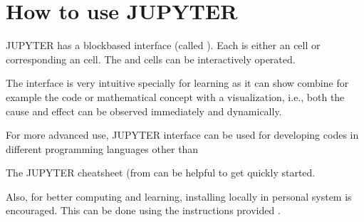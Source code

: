 \documentclass[letterpaper,10pt,english]{sphinxmanual}
\let\sphinxpxdimen\pdfpxdimen\else\newdimen\sphinxpxdimen
\begin{document}
\section{How to use JUPYTER}
\label{\detokenize{contents/background/02_jupyter:how-to-use-jupyter}}
JUPYTER has a block\sphinxhyphen{}based interface (called ). Each  is either an  cell or corresponding an   cell. The  and  cells can be interactively operated.

\noindent\sphinxincludegraphics[width=600\sphinxpxdimen]{{bg2_f1}.png}

The  interface is very intuitive specially for learning as it can show combine for example the code or mathematical concept with a visualization, i.e., both the cause and effect can be observed immediately and dynamically.

\noindent\sphinxincludegraphics[width=600\sphinxpxdimen]{{bg2_f2}.png}

For more advanced use, JUPYTER interface can be used for developing codes in different programming languages other than 

The JUPYTER cheat\sphinxhyphen{}sheet (from \sphinxhref{https://datacamp-community-prod.s3.amazonaws.com/48093c40-5303-45f4-bbf9-0c96c0133c40}{here}{]} can be helpful to get quickly started.

Also, for better computing and learning, installing  locally in personal system is encouraged. This can be done using the instructions provided .

\begin{sphinxVerbatim}[commandchars=\\\{\}]
   
   
   
   
   


\end{sphinxVerbatim}
\end{document}
